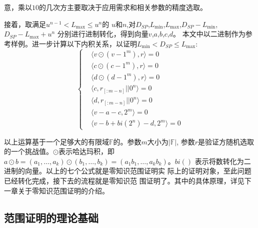 \documentclass[zihao=-4]{ctexart}
\begin{document}
\begin{spacing}{1.5}
意，乘以$10$的几次方主要取决于应用需求和相关参数的精度选取。\par
接着，取满足$u^{n-1}<L_{\max}\leq u^n$的
$u$和$n$,对$D_{SP}$,$L_{\min}$,$L_{\max}$,$D_{SP}-L_{\min}$,$D_{SP}-L_{\max}+u^n$
分别进行进制转化，得到向量$v$,$a$,$b$,$c$,$d$。
本文中以二进制作为参考样例。进一步计算以下内积关系，以证明$L_{\min}< D_{SP}\leq L_{\max}$:
\begin{equation}
  \begin{cases}
    &\langle v\odot(v-1^m),r\rangle=0\\
    &\langle c\odot(c-1^m),r\rangle=0\\
    &\langle d\odot(d-1^m),r\rangle=0\\
    &\langle c,r_{[:m-n]}||0^n\rangle=0\\
    &\langle d,r_{[:m-n]}||0^n\rangle=0\\
    &\langle v-a-c,2^m\rangle=0\\
    &\langle v-b+bi(2^n)-d,2^m\rangle=0
  \end{cases}
\end{equation}
\par
以上运算基于一个足够大的有限域$\mathbb{F}$的。参数$m$大小为$|\mathbb{F}|$,
参数$r$是验证方随机选取的一个挑战值。$\odot$表示哈达玛积，即
$a\odot b=(a_1,\ldots,a_k)\odot(b_1,\ldots,b_k)=(a_1b_1,\ldots,a_kb_k)$。$bi()$
表示将数转化为二进制的向量。以上的七个公式就是零知识范围证明实
际上的证明对象，至此问题已经转化完成，接下去的流程就是零知识范
围证明了。其中的具体原理，详见下一章关于零知识范围证明的介绍。
\subsection{范围证明的理论基础}

\end{spacing}
\end{document}
